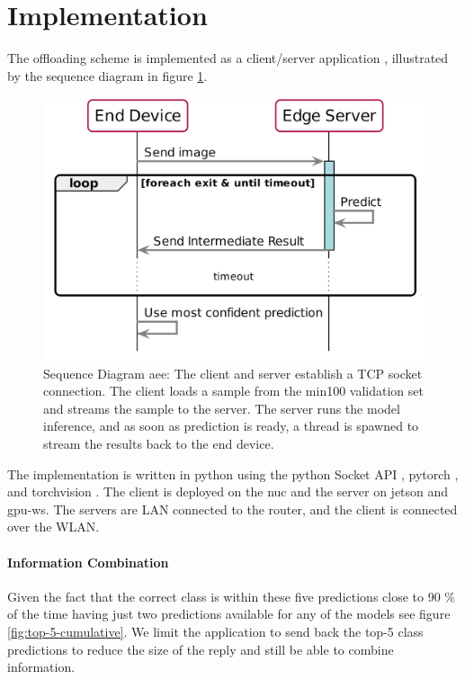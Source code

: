 \section{Implementation} \label{sec:edge-implementation}

The offloading scheme is implemented as a client/server application \cite{sommerville_software_2015}, illustrated by the sequence diagram in figure \ref{fig:sequence-diagram}. 

\begin{figure}
	\captionsetup[subfigure]{justification=centering}
	\centering
	\includegraphics[width=.7\linewidth]{figures/models/sequence_diagram}
	\caption[Sequence Diagram \acrshort{aee}]{Sequence Diagram \acrshort{aee}: The client and server establish a TCP socket connection. The client loads a sample from the \gls{min100} validation set and streams the sample to the server. The server runs the model inference, and as soon as prediction is ready, a thread is spawned to stream the results back to the end device.}
	\label{fig:sequence-diagram}
\end{figure}

The implementation is written in \gls{python} using the \gls{python} Socket API \cite{noauthor_socket_nodate}, \gls{pytorch} \cite{paszke_automatic_2017}, and \gls{torchvision} \cite{marcel_torchvision_2010}. The client is deployed on the \gls{nuc} and the server on \gls{jetson} and \gls{gpu-ws}. The servers are LAN connected to the router, and the client is connected over the WLAN.

\paragraph{Information Combination}

Given the fact that the correct class is within these five predictions close to 90 \% of the time having just two predictions available for any of the models see figure \ref{fig:top-5-cumulative}. We limit the application to send back the top-5 class predictions to reduce the size of the reply and still be able to combine information. 

